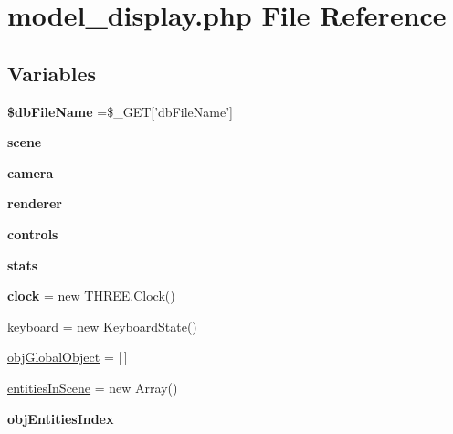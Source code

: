 \hypertarget{model__display_8php}{\section{model\-\_\-display.\-php File Reference}
\label{model__display_8php}
}
\subsection*{Variables}
\begin{DoxyCompactItemize}
\item 
\hypertarget{model__display_8php_ab20da318c11da52be7a0bd751aa80ba2}{{\bfseries \$db\-File\-Name} =\$\-\_\-\-G\-E\-T\mbox{[}'db\-File\-Name'\mbox{]}}\label{model__display_8php_ab20da318c11da52be7a0bd751aa80ba2}

\item 
\hypertarget{model__display_8php_a875c09064c40e58287c5e8ede4dac84c}{{\bfseries scene}}\label{model__display_8php_a875c09064c40e58287c5e8ede4dac84c}

\item 
\hypertarget{model__display_8php_ad6a80693cab5d3362ec8a576848102de}{{\bfseries camera}}\label{model__display_8php_ad6a80693cab5d3362ec8a576848102de}

\item 
\hypertarget{model__display_8php_ae449651aaebbeb5e14a249d660728088}{{\bfseries renderer}}\label{model__display_8php_ae449651aaebbeb5e14a249d660728088}

\item 
\hypertarget{model__display_8php_a27e71413e5daaa6ea9fc7ef78a859ab8}{{\bfseries controls}}\label{model__display_8php_a27e71413e5daaa6ea9fc7ef78a859ab8}

\item 
\hypertarget{model__display_8php_aa57ebe01934de43865125819a3c4af74}{{\bfseries stats}}\label{model__display_8php_aa57ebe01934de43865125819a3c4af74}

\item 
\hypertarget{model__display_8php_af761a67e9d7ce9e23381088b6f2ae893}{{\bfseries clock} = new T\-H\-R\-E\-E.\-Clock()}\label{model__display_8php_af761a67e9d7ce9e23381088b6f2ae893}

\item 
\hyperlink{model__display_8php_a9976f3faad68f981f425583e48b03252}{keyboard} = new Keyboard\-State()
\item 
\hyperlink{model__display_8php_ac5a54459373100893f6d7cda55df4463}{obj\-Global\-Object} = \mbox{[}$\,$\mbox{]}
\item 
\hyperlink{model__display_8php_a979a99c92317f74763728af573f3ddb4}{entities\-In\-Scene} = new Array()
\item 
\hypertarget{model__display_8php_a605395f85302942fe22d5ae5620658a4}{{\bfseries obj\-Entities\-Index}}\label{model__display_8php_a605395f85302942fe22d5ae5620658a4}


\end{DoxyCompactItemize}
